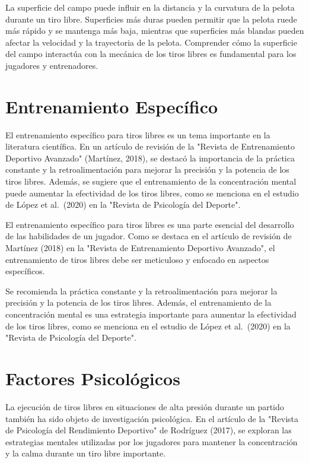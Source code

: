 \documentclass[
    a4paper,%
    DIV=calc,%
    abstract=true%
  ]{scrartcl}%
\begin{document}
  La superficie del campo puede influir en la distancia y la curvatura
  de la pelota durante un tiro libre. Superficies más duras pueden
  permitir que la pelota ruede más rápido y se mantenga más baja,
  mientras que superficies más blandas pueden afectar la velocidad y la
  trayectoria de la pelota. Comprender cómo la superficie del campo
  interactúa con la mecánica de los tiros libres es fundamental para los
  jugadores y entrenadores.

  \section{Entrenamiento Específico}\label{entrenamiento-especuxedfico}

  El entrenamiento específico para tiros libres es un tema importante en
  la literatura científica. En un artículo de revisión de la "Revista de
  Entrenamiento Deportivo Avanzado" (Martínez, 2018), se destacó la
  importancia de la práctica constante y la retroalimentación para
  mejorar la precisión y la potencia de los tiros libres. Además, se
  sugiere que el entrenamiento de la concentración mental puede aumentar
  la efectividad de los tiros libres, como se menciona en el estudio de
  López et al.~(2020) en la "Revista de Psicología del Deporte".

  El entrenamiento específico para tiros libres es una parte esencial
  del desarrollo de las habilidades de un jugador. Como se destaca en el
  artículo de revisión de Martínez (2018) en la "Revista de
  Entrenamiento Deportivo Avanzado", el entrenamiento de tiros libres
  debe ser meticuloso y enfocado en aspectos específicos.

  Se recomienda la práctica constante y la retroalimentación para
  mejorar la precisión y la potencia de los tiros libres. Además, el
  entrenamiento de la concentración mental es una estrategia importante
  para aumentar la efectividad de los tiros libres, como se menciona en
  el estudio de López et al.~(2020) en la "Revista de Psicología del
  Deporte".

  \section{Factores Psicológicos}\label{factores-psicoluxf3gicos}

  La ejecución de tiros libres en situaciones de alta presión durante un
  partido también ha sido objeto de investigación psicológica. En el
  artículo de la "Revista de Psicología del Rendimiento Deportivo" de
  Rodríguez (2017), se exploran las estrategias mentales utilizadas por
  los jugadores para mantener la concentración y la calma durante un
  tiro libre importante.
\end{document}
